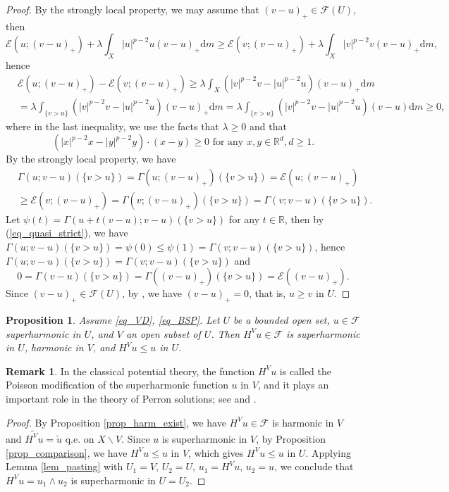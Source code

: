 \documentclass[11pt,a4paper]{article}
\numberwithin{equation}{section}
\theoremstyle{plain}
\newtheorem{proposition}[theorem]{Proposition}
\theoremstyle{definition}
\newtheorem{remark}[theorem]{Remark}
\begin{document}
\begin{proof}
By the strongly local property, we may assume that $(v-u)_+\in\mathcal{F}(U)$, then
$$\mathcal{E}(u;(v-u)_+)+\lambda\int_X|u|^{p-2}u(v-u)_+\mathrm{d} m\ge\mathcal{E}(v;(v-u)_+)+\lambda\int_X|v|^{p-2}v(v-u)_+\mathrm{d} m,$$
hence
\begin{align*}
&\mathcal{E}(u;(v-u)_+)-\mathcal{E}(v;(v-u)_+)\ge\lambda\int_X\left(|v|^{p-2}v-|u|^{p-2}u\right)(v-u)_+\mathrm{d} m\\
&=\lambda\int_{\{v>u\}}\left(|v|^{p-2}v-|u|^{p-2}u\right)(v-u)_+\mathrm{d} m=\lambda\int_{\{v>u\}}\left(|v|^{p-2}v-|u|^{p-2}u\right)(v-u)\mathrm{d} m\ge0,
\end{align*}
where in the last inequality, we use the facts that $\lambda\ge0$ and that
$$\left(|x|^{p-2}x-|y|^{p-2}y\right)\cdot(x-y)\ge0\text{ for any }x,y\in\mathbb{R}^d,d\ge1.$$
By the strongly local property, we have
\begin{align*}
&\Gamma(u;v-u)(\{v>u\})=\Gamma(u;(v-u)_+)(\{v>u\})=\mathcal{E}(u;(v-u)_+)\\
&\ge\mathcal{E}(v;(v-u)_+)=\Gamma(v;(v-u)_+)(\{v>u\})=\Gamma(v;v-u)(\{v>u\}).
\end{align*}
Let $\psi(t)=\Gamma(u+t(v-u);v-u)(\{v>u\})$ for any $t\in\mathbb{R}$, then by (\ref{eq_quasi_strict}), we have $\Gamma(u;v-u)(\{v>u\})=\psi(0)\le\psi(1)=\Gamma(v;v-u)(\{v>u\})$, hence $\Gamma(u;v-u)(\{v>u\})=\Gamma(v;v-u)(\{v>u\})$ and
$$0=\Gamma(v-u)(\{v>u\})=\Gamma((v-u)_+)(\{v>u\})=\mathcal{E}((v-u)_+).$$
Since $(v-u)_+\in\mathcal{F}(U)$, by \cite[Lemma 4.1]{Yan25c}, we have $(v-u)_+=0$, that is, $u\ge v$ in $U$.
\end{proof}

\begin{proposition}\label{prop_Pois_modi}
Assume \ref{eq_VD}, \ref{eq_BSP}. Let $U$ be a bounded open set, $u\in\mathcal{F}$ superharmonic in $U$, and $V$ an open subset of $U$. Then $H^{V}u\in\mathcal{F}$ is superharmonic in $U$, harmonic in $V$, and $H^{V}u\le u$ in $U$.
\end{proposition}

\begin{remark}
In the classical potential theory, the function $H^{V}u$ is called the Poisson modification of the superharmonic function $u$ in $V$, and it plays an important role in the theory of Perron solutions; see \cite[7.13]{HKM06} and \cite[Theorem 9.44, Section 10.9]{BB11}.
\end{remark}

\begin{proof}
By Proposition \ref{prop_harm_exist}, we have $H^{V}u\in\mathcal{F}$ is harmonic in $V$ and $\widetilde{H^{V}u}=\widetilde{u}$ q.e. on $X\backslash V$. Since $u$ is superharmonic in $V$, by Proposition \ref{prop_comparison}, we have $H^{V}u\le u$ in $V$, which gives $H^{V}u\le u$ in $U$. Applying Lemma \ref{lem_pasting} with $U_1=V$, $U_2=U$, $u_1=H^{V}u$, $u_2=u$, we conclude that $H^{V}u=u_1\wedge u_2$ is superharmonic in $U=U_2$.
\end{proof}
\end{document}
